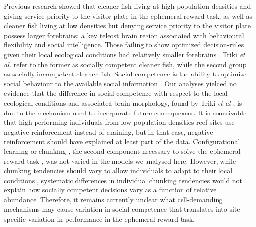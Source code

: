 \documentclass[]{rsos}%
\begin{document}
Previous research showed that cleaner fish living at high population
densities and giving service priority to the visitor plate in the
ephemeral reward task, as well as cleaner fish living at low
densities but denying service priority to the visitor plate possess
larger forebrains; a key teleost brain region associated with
behavioural flexibility and social intelligence. Those failing to
show optimized decision-rules given their local ecological
conditions had relatively smaller forebrains \citep{triki_Brain_2020}.
Triki \emph{et al.} refer to the former as socially competent cleaner fish,
while the second group as socially incompetent cleaner fish.
Social competence is the ability to optimise social behaviour
to the available social information \citep{taborsky_Social_2012, bshary_Cooperation_2015, varela_Correlated_2020}. Our analyses yielded no
evidence that the difference in social competence with respect to the local
ecological conditions and associated brain morphology,
found by Triki \emph{et al} \citep{triki_Brain_2020}, is due to the mechanism
used to incorporate future consequences. It is conceivable that
high performing individuals from low population densities reef sites
use negative reinforcement instead of chaining, but in that
case, negative reinforcement should have explained at least
part of the data. Configurational learning or
chunking \citep{sutherland_Configural_1989, miller_Magical_1956},
the second component necessary to solve the ephemeral
reward task \citep{quinones_Reinforcement_2019}, was
not varied in the models we analysed here. However, while chunking tendencies
should vary to allow individuals to adapt to their local conditions
\citep{prat_Modelling_2022, kolodny_Evolution_2014}, systematic differences
in individual chunking tendencies would not explain how socially
competent decisions vary as a function of relative abundance.
Therefore, it remains currently unclear what cell-demanding
mechanisms may cause variation in social competence that
translates into site-specific variation in performance in the
ephemeral reward task.
\end{document}
